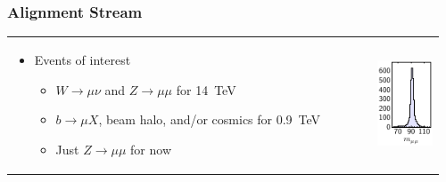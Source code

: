 \documentclass[compress]{beamer}
\begin{document}
\begin{frame}
  \frametitle{Alignment Stream}

  \vspace{-0.25 cm}
  \hspace{-0.5 cm}
  \begin{tabular}{p{0.81\linewidth} p{0.15\linewidth}}
    \hspace{0.1 cm}
    \begin{minipage}{\linewidth}
      \begin{itemize}
      \item Events of interest
	\begin{itemize}
          \item $W\to\mu\nu$ and $Z\to\mu\mu$ for 14~TeV
	  \item $b\to\mu X$, beam halo, and/or cosmics for 0.9~TeV
	  \item Just $Z\to\mu\mu$ for now
	\end{itemize}
      \end{itemize}
    \end{minipage} &
    \begin{minipage}{\linewidth}
      \includegraphics[width=\linewidth]{zpeak}
    \end{minipage}
  \end{tabular}


\end{frame}
\end{document}
